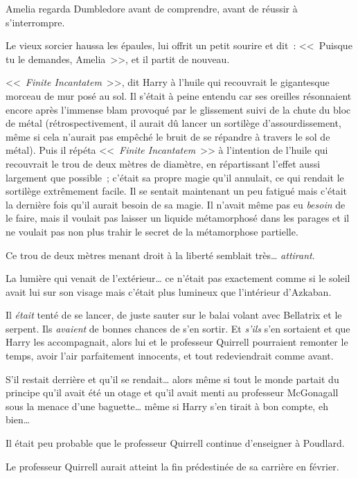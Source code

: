 Amelia regarda Dumbledore avant de comprendre, avant de réussir à s'interrompre.

Le vieux sorcier haussa les épaules, lui offrit un petit sourire et dit~: <<~Puisque tu le demandes, Amelia~>>, et il partit de nouveau.

\later

<<~\emph{Finite Incantatem}~>>, dit Harry à l'huile qui recouvrait le gigantesque morceau de mur posé au sol. Il s'était à peine entendu car ses oreilles résonnaient encore après l'immense blam provoqué par le glissement suivi de la chute du bloc de métal (rétrospectivement, il aurait dû lancer un sortilège d'assourdissement, même si cela n'aurait pas empêché le bruit de se répandre à travers le sol de métal). Puis il répéta <<~\emph{Finite Incantatem}~>> à l'intention de l'huile qui recouvrait le trou de deux mètres de diamètre, en répartissant l'effet aussi largement que possible~; c'était sa propre magie qu'il annulait, ce qui rendait le sortilège extrêmement facile. Il se sentait maintenant un peu fatigué mais c'était la dernière fois qu'il aurait besoin de sa magie. Il n'avait même pas eu \emph{besoin} de le faire, mais il voulait pas laisser un liquide métamorphosé dans les parages et il ne voulait pas non plus trahir le secret de la métamorphose partielle.

Ce trou de deux mètres menant droit à la liberté semblait très… \emph{attirant}.

La lumière qui venait de l'extérieur… ce n'était pas exactement comme si le soleil avait lui sur son visage mais c'était plus lumineux que l'intérieur d'Azkaban.

Il \emph{était} tenté de se lancer, de juste sauter sur le balai volant avec Bellatrix et le serpent. Ils \emph{avaient} de bonnes chances de s'en sortir. Et \emph{s'ils} s'en sortaient et que Harry les accompagnait, alors lui et le professeur Quirrell pourraient remonter le temps, avoir l'air parfaitement innocents, et tout redeviendrait comme avant.

S'il restait derrière et qu'il se rendait… alors même si tout le monde partait du principe qu'il avait été un otage et qu'il avait menti au professeur McGonagall sous la menace d'une baguette… même si Harry s'en tirait à bon compte, eh bien…

Il était peu probable que le professeur Quirrell continue d'enseigner à Poudlard.

Le professeur Quirrell aurait atteint la fin prédestinée de sa carrière en février.

